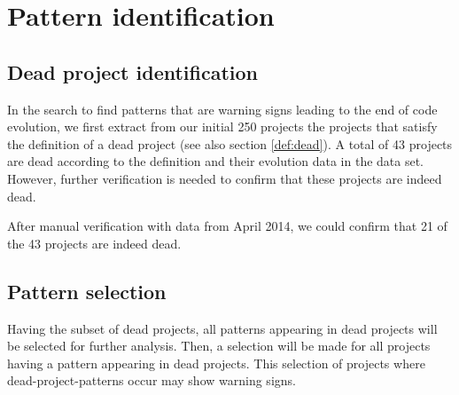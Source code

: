 \section{Pattern identification}
\subsection{Dead project identification}
In the search to find patterns that are warning signs leading to the end of
code evolution, we first extract from our initial 250 projects the projects
that satisfy the definition of a dead project (see also section \ref{def:dead}).
A total of 43 projects are dead according to the definition and their evolution
data in the data set. However, further verification is needed to confirm that
these projects are indeed dead.

After manual verification with data from April 2014, we could confirm that 21
of the 43 projects are indeed dead.

\subsection{Pattern selection}
Having the subset of dead projects, all patterns appearing in dead projects
will be selected for further analysis. Then, a selection will be made for all
projects having a pattern appearing in dead projects. This selection of
projects where dead-project-patterns occur may show warning signs.

\begin{comment}
- Execution of the research
- Phases, steps

This chapter reports on the execution of the research method as described in Chapter 3.

If the research has been divided into phases (e.g., using sub questions) the
phases are introduced, reported on and concluded individually. If needed this
Chapter could be split up to balance out the sizes of all Chapters.
An example Research Chapter is provided as Chapter 3 at Paul’s home
page\footnote{http://homepages.cwi.nl/~paulk/thesesMasterSoftwareEngineering/2006/ReneWiegers.pdf}.
\end{comment}
